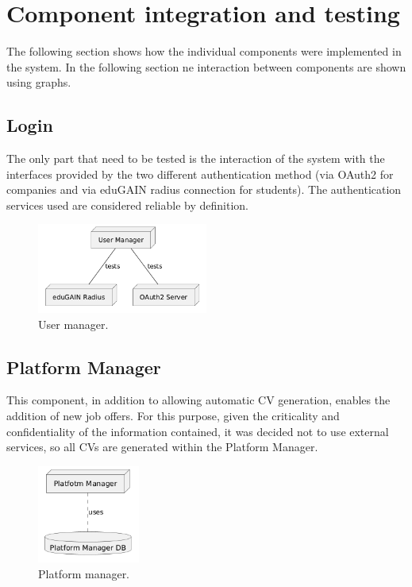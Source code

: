 \section{Component integration and testing}
The following section shows how the individual components were implemented in the system.
In the following section ne interaction between components are shown using graphs.

\subsection{Login}
The only part that need to be tested is the interaction of the system with the interfaces
provided by the two different authentication method (via OAuth2 for companies and via eduGAIN radius connection for students). The authentication services used are considered reliable by definition. 

\begin{figure}[H]
    \centering
    \includegraphics[width=0.5\textwidth]{dd/assets/componen-itntegration-diagram/1-login.png}
    \caption{User manager.}
    \label{fig:User manager}
\end{figure}

\subsection{Platform Manager}
This component, in addition to allowing automatic CV generation, enables the addition of new job offers.
For this purpose, given the criticality and confidentiality of the information contained, it was decided not to use external services, so all CVs are generated within the Platform Manager.

\begin{figure}[H]
    \centering
    \includegraphics[width=0.3\textwidth]{dd/assets/componen-itntegration-diagram/2-platform-manager.png}
    \caption{Platform manager.}
    \label{fig:Platform manager}
\end{figure}

